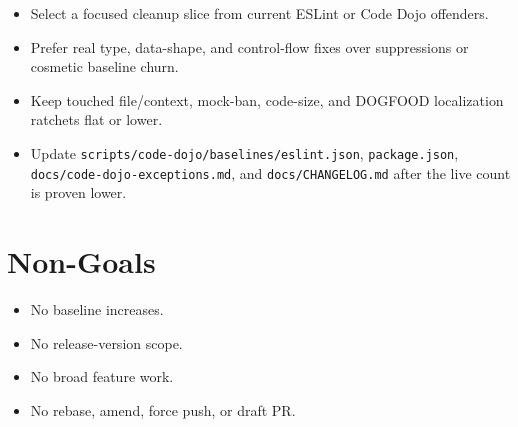 \begin{itemize}
\tightlist
\item
  Select a focused cleanup slice from current ESLint or Code Dojo offenders.
\item
  Prefer real type, data-shape, and control-flow fixes over suppressions or cosmetic baseline churn.
\item
  Keep touched file/context, mock-ban, code-size, and DOGFOOD localization ratchets flat or lower.
\item
  Update \texttt{s\allowbreak{}c\allowbreak{}r\allowbreak{}i\allowbreak{}p\allowbreak{}t\allowbreak{}s\allowbreak{}/\allowbreak{}c\allowbreak{}o\allowbreak{}d\allowbreak{}e\allowbreak{}-\allowbreak{}d\allowbreak{}o\allowbreak{}j\allowbreak{}o\allowbreak{}/\allowbreak{}b\allowbreak{}a\allowbreak{}s\allowbreak{}e\allowbreak{}l\allowbreak{}i\allowbreak{}n\allowbreak{}e\allowbreak{}s\allowbreak{}/\allowbreak{}e\allowbreak{}s\allowbreak{}l\allowbreak{}i\allowbreak{}n\allowbreak{}t\allowbreak{}.\allowbreak{}j\allowbreak{}s\allowbreak{}o\allowbreak{}n}, \texttt{p\allowbreak{}a\allowbreak{}c\allowbreak{}k\allowbreak{}a\allowbreak{}g\allowbreak{}e\allowbreak{}.\allowbreak{}j\allowbreak{}s\allowbreak{}o\allowbreak{}n}, \texttt{d\allowbreak{}o\allowbreak{}c\allowbreak{}s\allowbreak{}/\allowbreak{}c\allowbreak{}o\allowbreak{}d\allowbreak{}e\allowbreak{}-\allowbreak{}d\allowbreak{}o\allowbreak{}j\allowbreak{}o\allowbreak{}-\allowbreak{}e\allowbreak{}x\allowbreak{}c\allowbreak{}e\allowbreak{}p\allowbreak{}t\allowbreak{}i\allowbreak{}o\allowbreak{}n\allowbreak{}s\allowbreak{}.\allowbreak{}m\allowbreak{}d}, and \texttt{d\allowbreak{}o\allowbreak{}c\allowbreak{}s\allowbreak{}/\allowbreak{}C\allowbreak{}H\allowbreak{}A\allowbreak{}N\allowbreak{}G\allowbreak{}E\allowbreak{}L\allowbreak{}O\allowbreak{}G\allowbreak{}.\allowbreak{}m\allowbreak{}d} after the live count is proven lower.
\end{itemize}

\section{Non-Goals}\label{record-234-non-goals}

\begin{itemize}
\tightlist
\item
  No baseline increases.
\item
  No release-version scope.
\item
  No broad feature work.
\item
  No rebase, amend, force push, or draft PR.
\end{itemize}

